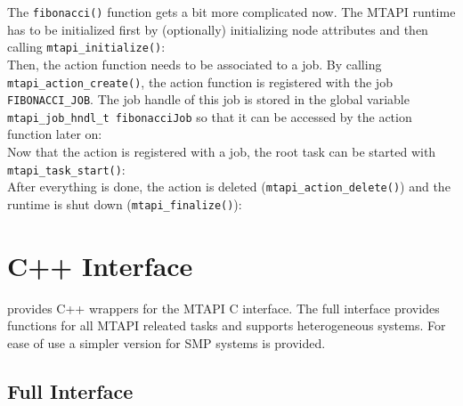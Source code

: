 The \lstinline|fibonacci()| function gets a bit more complicated now. The MTAPI runtime has to be initialized first by (optionally) initializing node attributes and then calling \lstinline|mtapi_initialize()|:
%
\\
%
Then, the action function needs to be associated to a job. By calling \lstinline|mtapi_action_create()|, the action function is registered with the job \lstinline|FIBONACCI_JOB|. The job handle of this job is stored in the global variable \lstinline|mtapi_job_hndl_t fibonacciJob| so that it can be accessed by the action function later on:
%
\\
%
Now that the action is registered with a job, the root task can be started with \lstinline|mtapi_task_start()|:
%
\\
%
After everything is done, the action is deleted (\lstinline|mtapi_action_delete()|) and the runtime is shut down (\lstinline|mtapi_finalize()|):
%
\\
%

\section{C++ Interface}
\label{sec:mtapi_cpp_interface}

\embb provides C++ wrappers for the MTAPI C interface. The full interface provides functions for all MTAPI releated tasks and supports heterogeneous systems. For ease of use a simpler version for SMP systems is provided.

\subsection{Full Interface}

